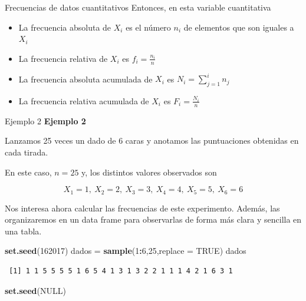\documentclass[
  ignorenonframetext,
  aspectratio=169]{beamer}
\newenvironment{Shaded}{\begin{snugshade}}{\end{snugshade}}
\newcommand{\AttributeTok}[1]{\textcolor[rgb]{0.13,0.29,0.53}{#1}}
\newcommand{\ConstantTok}[1]{\textcolor[rgb]{0.56,0.35,0.01}{#1}}
\newcommand{\DecValTok}[1]{\textcolor[rgb]{0.00,0.00,0.81}{#1}}
\newcommand{\FunctionTok}[1]{\textcolor[rgb]{0.13,0.29,0.53}{\textbf{#1}}}
\newcommand{\NormalTok}[1]{#1}
\newcommand{\OtherTok}[1]{\textcolor[rgb]{0.56,0.35,0.01}{#1}}
\newcommand{\SpecialCharTok}[1]{\textcolor[rgb]{0.81,0.36,0.00}{\textbf{#1}}}
\providecommand{\tightlist}{%
  \setlength{\itemsep}{0pt}\setlength{\parskip}{0pt}}
\begin{document}
\begin{frame}{Frecuencias de datos cuantitativos}
\label{frecuencias-de-datos-cuantitativos-2}
Entonces, en esta variable cuantitativa

\begin{itemize}
\tightlist
\item
  La frecuencia absoluta de \(X_i\) es el número \(n_i\) de elementos
  que son iguales a \(X_i\)
\item
  La frecuencia relativa de \(X_i\) es \(f_i=\frac{n_i}{n}\)
\item
  La frecuencia absoluta acumulada de \(X_i\) es \(N_i=\sum_{j=1}^in_j\)
\item
  La frecuencia relativa acumulada de \(X_i\) es \(F_i=\frac{N_i}{n}\)
\end{itemize}
\end{frame}

\begin{frame}[fragile]{Ejemplo 2}
\label{ejemplo-2-2}
\textbf{Ejemplo 2}

Lanzamos 25 veces un dado de 6 caras y anotamos las puntuaciones
obtenidas en cada tirada.

En este caso, \(n=25\) y, los distintos valores observados son

\[X_1 = 1,\ X_2 = 2,\ X_3 = 3,\ X_4 = 4,\ X_5 = 5,\ X_6 = 6\]

Nos interesa ahora calcular las frecuencias de este experimento. Además,
las organizaremos en un data frame para observarlas de forma más clara y
sencilla en una tabla.

\begin{Shaded}
\begin{Highlighting}[]
\FunctionTok{set.seed}\NormalTok{(}\DecValTok{162017}\NormalTok{)}
\NormalTok{dados }\OtherTok{=} \FunctionTok{sample}\NormalTok{(}\DecValTok{1}\SpecialCharTok{:}\DecValTok{6}\NormalTok{,}\DecValTok{25}\NormalTok{,}\AttributeTok{replace =} \ConstantTok{TRUE}\NormalTok{)}
\NormalTok{dados}
\end{Highlighting}
\end{Shaded}

\begin{verbatim}
 [1] 1 1 5 5 5 5 1 6 5 4 1 3 1 3 2 2 1 1 1 4 2 1 6 3 1
\end{verbatim}

\begin{Shaded}
\begin{Highlighting}[]
\FunctionTok{set.seed}\NormalTok{(}\ConstantTok{NULL}\NormalTok{)}
\end{Highlighting}
\end{Shaded}
\end{frame}
\end{document}
